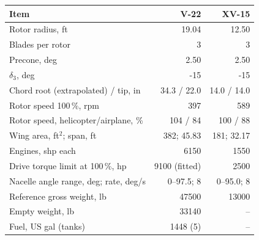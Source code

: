\begin{tabular}{@{}@{}l r r@{}}
\toprule
Item & V-22 & XV-15 \\
\midrule
Rotor radius, ft & 19.04 & 12.50 \\
Blades per rotor & 3 & 3 \\
Precone, deg & 2.50 & 2.50 \\
$\delta_3$, deg & -15 & -15 \\
Chord root (extrapolated) / tip, in & 34.3 / 22.0 & 14.0 / 14.0 \\
Rotor speed 100\,\%, rpm & 397 & 589 \\
Rotor speed, helicopter/airplane, \% & 104 / 84 & 100 / 88 \\
Wing area, ft$^2$; span, ft & 382; 45.83 & 181; 32.17 \\
Engines, shp each & 6150 & 1550 \\
Drive torque limit at 100\,\%, hp & 9100 (fitted) & 2500 \\
Nacelle angle range, deg; rate, deg/s & 0--97.5; 8 & 0--95.0; 8 \\
Reference gross weight, lb & 47500 & 13000 \\
Empty weight, lb & 33140 & -- \\
Fuel, US gal (tanks) & 1448 (5) & -- \\
\bottomrule
\end{tabular}
